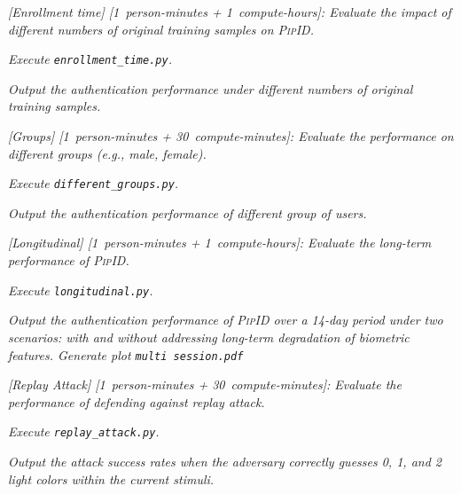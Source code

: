 \documentclass[sigconf]{acmart}
\newcommand{\sysname}{\textsc{PipID}\xspace}
\begin{document}
\begin{compactitem}
\item[(E5):] \emph{[Enrollment time] [1~person-minutes + 1~compute-hours]: Evaluate the impact of different numbers of original training samples on \sysname.}
  \begin{asparadesc}
  \item[Execution:] \emph{Execute \texttt{enrollment\_time.py}.}

  \item[Results:] \emph{Output the authentication performance under different numbers of original training samples.}
  \end{asparadesc}

\item[(E6):] \emph{[Groups] [1~person-minutes + 30~compute-minutes]: Evaluate the performance on different groups (e.g., male, female).}
  \begin{asparadesc}
  \item[Execution:] \emph{Execute \texttt{different\_groups.py}.}

  \item[Results:] \emph{Output the authentication performance of different group of users.}
  \end{asparadesc}

\item[(E7):] \emph{[Longitudinal] [1~person-minutes + 1~compute-hours]: Evaluate the long-term performance of \sysname.}
  \begin{asparadesc}
  \item[Execution:] \emph{Execute \texttt{longitudinal.py}.}

  \item[Results:] \emph{Output the authentication performance of \sysname over a 14-day period under two scenarios: with and without addressing long-term degradation of biometric features. Generate plot \texttt{multi session.pdf}}
  \end{asparadesc}

\item[(E8):] \emph{[Replay Attack] [1~person-minutes + 30~compute-minutes]: Evaluate the performance of defending against replay attack.}
  \begin{asparadesc}
  \item[Execution:] \emph{Execute \texttt{replay\_attack.py}.}

  \item[Results:] \emph{Output the attack success rates when the adversary correctly guesses 0, 1, and 2 light colors within the current stimuli.}
  \end{asparadesc}


\end{compactitem}
\end{document}
